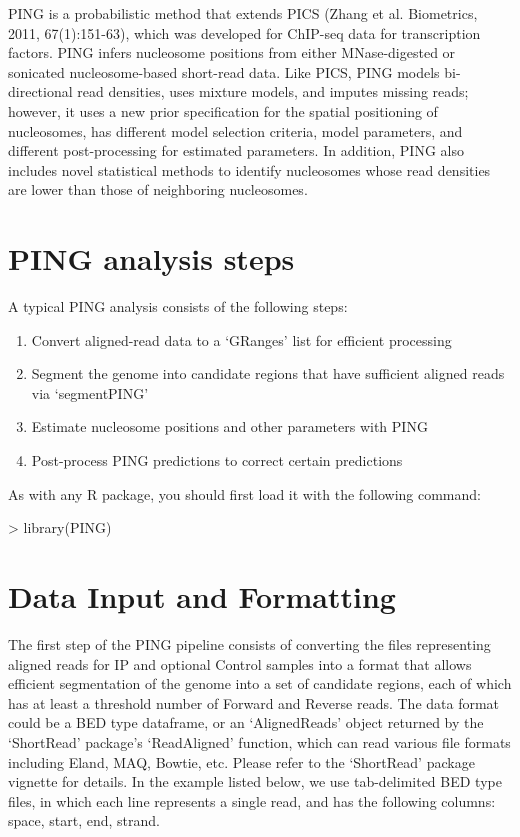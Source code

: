\documentclass[11pt]{article}
\begin{document}
PING is a probabilistic method that extends PICS (Zhang et al. Biometrics, 2011, 67(1):151-63), which was developed for ChIP-seq data for transcription factors. PING infers nucleosome positions from either MNase-digested or sonicated nucleosome-based short-read data. Like PICS, PING models bi-directional read densities, uses mixture models, and imputes missing reads; however, it uses a new prior specification for the spatial positioning of nucleosomes, has different model selection criteria, model parameters, and different post-processing for estimated parameters. In addition, PING also includes novel statistical methods to identify nucleosomes whose read densities are lower than those of neighboring nucleosomes. 

\section{PING analysis steps}
A typical PING analysis consists of the following steps:
\begin{enumerate}
  \item Convert aligned-read data to a `GRanges' list for efficient processing
  \item Segment the genome into candidate regions that have sufficient aligned reads via `segmentPING'
  \item Estimate nucleosome positions and other parameters with PING
  \item Post-process PING predictions to correct certain predictions
\end{enumerate}

As with any R package, you should first load it with the following command:

\begin{Schunk}
\begin{Sinput}
> library(PING)
\end{Sinput}
\end{Schunk}

\section{Data Input and Formatting}
The first step of the PING pipeline consists of converting the files representing aligned reads for IP and optional Control samples into a format that allows efficient segmentation of the genome into a set of candidate regions, each of which has at least a threshold number of Forward and Reverse reads. The data format could be a BED type dataframe, or an `AlignedReads' object returned by the `ShortRead' package's `ReadAligned' function, which can read various file formats including Eland, MAQ, Bowtie, etc. Please refer to the `ShortRead' package vignette for details.
In the example listed below, we use tab-delimited BED type files, in which each line represents a single read, and has the following columns: space, start, end, strand. 
\end{document}

